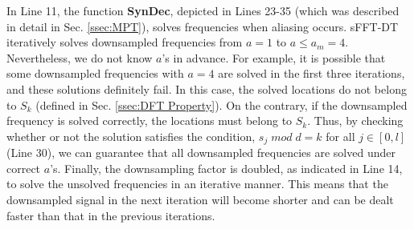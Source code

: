 \documentclass[journal,onecolumn,11pt]{IEEEtran}
\begin{document}
In Line 11, the function \textbf{SynDec}, depicted in Lines 23-35 (which was described in detail in Sec. \ref{ssec:MPT}), solves frequencies when aliasing occurs. sFFT-DT iteratively solves downsampled frequencies from $a=1$ to $a\leq a_{m}=4$.
Nevertheless, we do not know $a$'s in advance. For example, it is possible that some downsampled frequencies with $a=4$ are solved in the first three iterations, and these solutions definitely fail.
In this case, the solved locations do not belong to $  S_{k}$ (defined in Sec. \ref{ssec:DFT Property}). On the contrary, if the downsampled frequency is solved correctly, the locations must belong to $S_{k}$.
Thus, by checking whether or not the solution satisfies the condition, $s_{j}\;mod\;d=k$ for all $j \in [0,l]$ (Line 30), we can guarantee that all downsampled frequencies are solved under correct $a$'s.
Finally, the downsampling factor is doubled, as indicated in Line 14, to solve the unsolved frequencies in an iterative manner.
This means that the downsampled signal in the next iteration will become shorter and can be dealt faster than that in the previous iterations.
\end{document}
